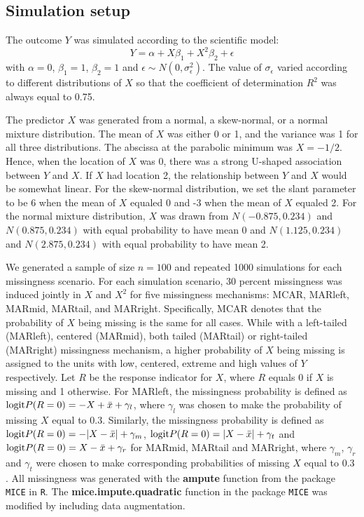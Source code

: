 	\subsection{Simulation setup}
	The outcome $Y$ was simulated according to the scientific model:
	\begin{equation}
		Y = \alpha + X\beta_{1} + X^2\beta_{2} +\epsilon
	\end{equation}
	with $\alpha = 0$, $\beta_{1} = 1$, $\beta_{2} = 1$ and  $\epsilon \sim N(0, \sigma_{\epsilon}^2)$. The value of $\sigma_{\epsilon}$ varied according to different distributions of $X$ so that the coefficient of determination $R^2$ was always equal to 0.75. 
	
	The predictor $X$ was generated from a normal, a skew-normal, or a normal mixture distribution. The mean of $X$ was either 0 or 1, and the variance was 1 for all three distributions. The abscissa at the parabolic minimum was $X = -1/2$. Hence, when the location of $X$ was 0, there was a strong U-shaped association between $Y$ and $X$. If $X$ had location 2, the relationship between $Y$ and $X$ would be somewhat linear. For the skew-normal distribution, we set the slant parameter to be 6 when the mean of $X$ equaled 0 and -3 when the mean of $X$ equaled 2. For the normal mixture distribution, $X$ was drawn from $N(-0.875, 0.234)$ and $N(0.875, 0.234)$ with equal probability to have mean 0 and $N(1.125, 0.234)$ and $N(2.875, 0.234)$ with equal probability to have mean 2. 
	
	We generated a sample of size $n = 100$ and repeated 1000 simulations for each missingness scenario. For each simulation scenario, 30 percent missingness was induced jointly in $X$ and $X^2$ for five missingness mechanisms: MCAR, MARleft, MARmid, MARtail, and MARright. Specifically, MCAR denotes that the probability of $X$ being missing is the same for all cases. While with a left-tailed (MARleft), centered (MARmid), both tailed (MARtail) or right-tailed (MARright) missingness mechanism, a higher probability of $X$ being missing is assigned to the units with low, centered, extreme and high values of $Y$ respectively. Let $R$ be the response indicator for $X$, where $R$ equals 0 if $X$ is missing and 1 otherwise. For MARleft, the missingness probability is defined as $\textnormal{logit} P(R = 0) = -X + \bar{x} + \gamma_{l}$, where $\gamma_{l}$ was chosen to make the probability of missing $X$ equal to 0.3. Similarly, the missingness probability is defined as $\textnormal{logit} P(R = 0) = -|X - \bar{x}| + \gamma_{m}$, $\textnormal{logit} P(R = 0) = |X - \bar{x}| + \gamma_{t}$ and $\textnormal{logit} P(R = 0) = X - \bar{x} + \gamma_{r}$ for MARmid, MARtail and MARright, where $\gamma_{m}$, $\gamma_{r}$ and $\gamma_{t}$ were chosen to make corresponding probabilities of missing $X$ equal to 0.3 \citep[Section 3.2.4]{Buuren2018}. All missingness was generated with the \textbf{ampute} function \citep{Schouten2018} from the package \texttt{MICE} \citep{Buuren2011} in \texttt{R}. The \textbf{mice.impute.quadratic} function in the package \texttt{MICE} was modified by including data augmentation.
